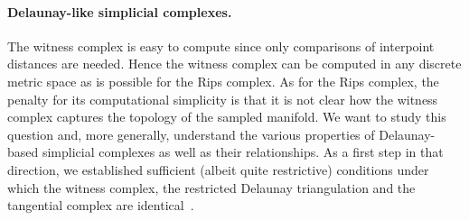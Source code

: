 \paragraph{Delaunay-like  simplicial complexes.} 
The witness complex is easy to compute since only comparisons of interpoint distances are needed. Hence the witness complex can be computed in any discrete metric space as is possible for the Rips complex. 
As for the Rips complex, the penalty for its computational simplicity is that it is not clear how the witness complex captures the topology of the sampled manifold. 
We want to study this question and, more generally, understand the various properties of Delaunay-based simplicial complexes as well as their relationships. As a  first step in that direction, we established sufficient (albeit quite restrictive) conditions under which the witness complex, the restricted Delaunay triangulation and the tangential complex are identical~\cite{boissonnat2012stab}. 

